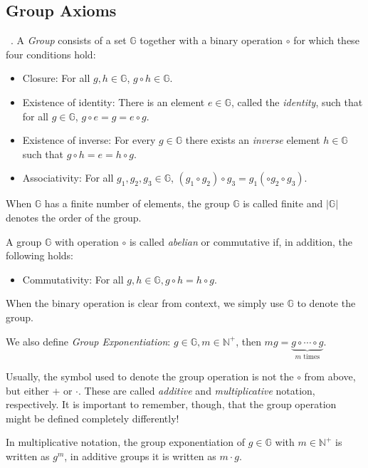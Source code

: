 \subsection{Group Axioms}
\begin{definition}~\cite{katz_introduction_2015}. A \emph{Group} consists of a set $\mathbb{G}$ together with a binary operation $\circ$ for which these four conditions hold:
    \begin{itemize}
        \item Closure: For all $g, h \in \mathbb{G}$, $g \circ h \in \mathbb{G}$.
        \item Existence of identity: There is an element $e \in \mathbb{G}$, called the \emph{identity}, such that for all $g \in \mathbb{G}$, $g \circ e = g = e \circ g$.
        \item Existence of inverse: For every $g \in \mathbb{G}$ there exists an \emph{inverse} element $h \in \mathbb{G}$ such that $g \circ h = e = h \circ g$.
        \item Associativity: For all $g_1, g_2, g_3 \in \mathbb{G}$, $(g_1 \circ g_2) \circ g_3 = g_1 (\circ g_2 \circ g_3)$.
    \end{itemize}
    When $\mathbb{G}$ has a finite number of elements, the group $\mathbb{G}$ is called finite and $|\mathbb{G}|$ denotes the order of the group.

    A group $\mathbb{G}$ with operation $\circ$ is called \emph{abelian} or commutative if, in addition, the following holds:
    \begin{itemize}
        \item Commutativity: For all $g, h \in \mathbb{G}, g \circ h = h \circ g$.
    \end{itemize}

    When the binary operation is clear from context, we simply use $\mathbb{G}$ to denote the group.

    We also define \emph{Group Exponentiation}: $g \in \mathbb{G}, m \in \mathbb{N}^+$, then $mg = \underbrace{g \circ \cdots \circ g}_{m \text{ times}}$.
\end{definition}

Usually, the symbol used to denote the group operation is not the $\circ$ from above, but either $+$ or $\cdot$. These are called \emph{additive} and \emph{multiplicative} notation, respectively.
It is important to remember, though, that the group operation might be defined completely differently!

In multiplicative notation, the group exponentiation of $g \in \mathbb{G}$ with $m \in \mathbb{N}^+$ is written as $g^m$, in additive groups it is written as $m \cdot g$.

